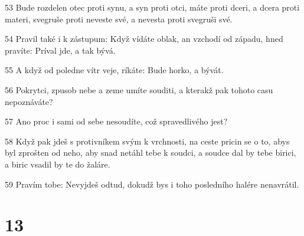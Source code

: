 \par 53 Bude rozdelen otec proti synu, a syn proti otci, máte proti dceri, a dcera proti materi, svegruše proti neveste své, a nevesta proti svegruši své.
\par 54 Pravil také i k zástupum: Když vídáte oblak, an vzchodí od západu, hned pravíte: Príval jde, a tak bývá.
\par 55 A když od poledne vítr veje, ríkáte: Bude horko, a bývát.
\par 56 Pokrytci, zpusob nebe a zeme umíte souditi, a kterakž pak tohoto casu nepoznáváte?
\par 57 Ano proc i sami od sebe nesoudíte, což spravedlivého jest?
\par 58 Když pak jdeš s protivníkem svým k vrchnosti, na ceste pricin se o to, abys byl zprošten od neho, aby snad netáhl tebe k soudci, a soudce dal by tebe birici, a biric vsadil by te do žaláre.
\par 59 Pravím tobe: Nevyjdeš odtud, dokudž bys i toho posledního halére nenavrátil.

\chapter{13}

